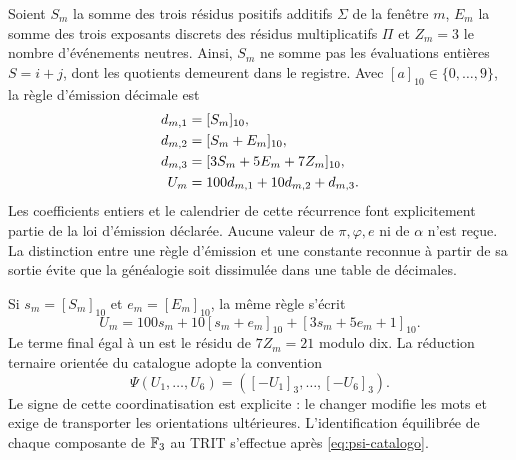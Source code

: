 Soient \(S_m\) la somme des trois résidus positifs additifs \(\Sigma\) de la fenêtre \(m\), \(E_m\) la somme des trois exposants discrets des résidus multiplicatifs \(\Pi\) et \(Z_m=3\) le nombre d’événements neutres. Ainsi, \(S_m\) ne somme pas les évaluations entières \(S=i+j\), dont les quotients demeurent dans le registre. Avec \([a]_{10}\in\{0,\ldots,9\}\), la règle d’émission décimale est
\begin{align}
 d_{m,1}&=[S_m]_{10},\notag\\
 d_{m,2}&=[S_m+E_m]_{10},\notag\\
 d_{m,3}&=[3S_m+5E_m+7Z_m]_{10},\notag\\
 U_m&=100d_{m,1}+10d_{m,2}+d_{m,3}.
 \label{eq:emisor-seis}
\end{align}
Les coefficients entiers et le calendrier de cette récurrence font explicitement partie de la loi d’émission déclarée. Aucune valeur de \(\pi,\varphi,e\) ni de \(\alpha\) n’est reçue. La distinction entre une règle d’émission et une constante reconnue à partir de sa sortie évite que la généalogie soit dissimulée dans une table de décimales.

Si \(s_m=[S_m]_{10}\) et \(e_m=[E_m]_{10}\), la même règle s’écrit
\begin{equation}
 U_m=100s_m+10[s_m+e_m]_{10}+[3s_m+5e_m+1]_{10}.
 \label{eq:acoplamiento}
\end{equation}
Le terme final égal à un est le résidu de \(7Z_m=21\) modulo dix. La réduction ternaire orientée du catalogue adopte la convention
\begin{equation}
 \Psi(U_1,\ldots,U_6)=([-U_1]_3,\ldots,[-U_6]_3).
 \label{eq:psi-catalogo}
\end{equation}
Le signe de cette coordinatisation est explicite : le changer modifie les mots et exige de transporter les orientations ultérieures. L'identification équilibrée de chaque composante de \(\mathbb F_3\) au TRIT s'effectue après \eqref{eq:psi-catalogo}.

